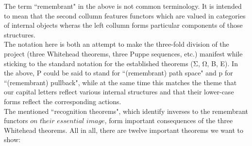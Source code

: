 \documentclass{book}
\theoremstyle{definition}
\begin{document}
The term ``remembrant" in the above is not common terminology. It is intended to mean that the second collumn features functors which are valued in categories of internal objects wheras the left collumn forms particular components of those structures.\\

The notation here is both an attempt to make the three-fold division of the project (three Whitehead theorems, three Puppe sequences, etc.) manifest while sticking to the standard notation for the established theorems (Σ, Ω, B, E). In the above, P could be said to stand for ``(remembrant) path space" and p for ``(remembrant) pullback", while at the same time this matches the theme that our capital letters reflect various internal structures and that their lower-case forms reflect the corresponding actions.\\

The mentioned ``recognition theorems", which identify inverses to the remembrant functors $\textit{on their essential image}$, form important consequences of the three Whitehead theorems. All in all, there are twelve important theorems we want to show:\\
\end{document}
